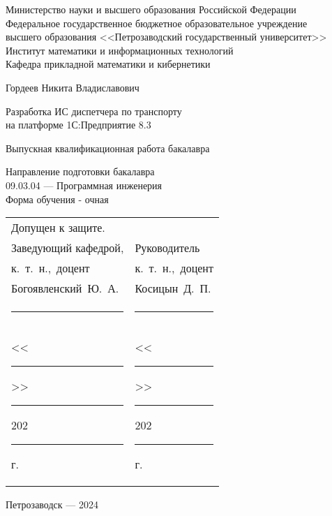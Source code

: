 { \large
\begin{center}
\renewcommand{\baselinestretch}{1.4}
Министерство науки и высшего образования Российской Федерации\\
\bigskip
Федеральное государственное бюджетное образовательное учреждение \\ 
высшего образования <<Петрозаводский государственный университет>>\\
\bigskip
Институт математики и информационных технологий\\
Кафедра прикладной математики и кибернетики\\

\end{center}
\vspace{3\bigskipamount}%

\vspace{3\bigskipamount}

\begin{center}
\large
Гордеев Никита Владиславович
\end{center}
\medskip%

\begin{center}
\renewcommand{\baselinestretch}{1.2}
\Large Разработка ИС диспетчера по транспорту \\ на платформе 1С:Предприятие 8.3
\end{center}
\medskip%


\begin{center}
\large
Выпускная квалификационная работа бакалавра
\end{center}
\medskip%

\begin{center}
\large
Направление подготовки бакалавра \\
09.03.04 --- Программная инженерия \\
Форма обучения - очная
\end{center}

\vspace{4\bigskipamount}%

\begin{tabular}{ l l }
	
	Допущен к защите. & \\
	Заведующий кафедрой, & \hspace{2cm} Руководитель\\
	к.~т.~н.,~доцент &  \hspace{2cm} к.~т.~н.,~доцент \\
	Богоявленский~Ю.~А. &  \hspace{2cm} Косицын~Д.~П. \\
	\noindent\rule{6cm}{0.2pt} &  \hspace{2cm} \noindent\rule{6cm}{0.2pt} \\
	<<\noindent\rule{1cm}{0.2pt}>>\noindent\rule{3cm}{0.2pt}202\noindent\rule{0.3cm}{0.2pt} г. &  \hspace{2cm}
  <<\noindent\rule{1cm}{0.2pt}>>\noindent\rule{3cm}{0.2pt}202\noindent\rule{0.3cm}{0.2pt} г.
  \\
\end{tabular}

\vfill%

\begin{center}
\large
Петрозаводск --- 2024
\end{center}
}
